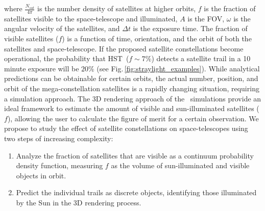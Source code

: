 \documentclass[usenames,dvipsnames,modern]{CLASS_FILES/aastex631}  %
\newcommand{\Hubble}{HST}
\begin{document}
where $\frac{N_{sat}}{4 \pi}$ is the number density of satellites at higher orbits, $f$ is the fraction of satellites visible to the space-telescope and illuminated, $A$ is the FOV, $\omega$ is the angular velocity of the satellites, and $\Delta t$ is the exposure time. The fraction of visible satellites ($f$) is a function of time, orientation, and the orbit of both the satellites and space-telescope. If the proposed satellite constellations become operational, the probability that \Hubble\ ($f\sim7\%$) detects a satellite trail in a 10 minute exposure will be $20\%$ (see Fig.\,\ref{fig:straylight_examples}). While analytical predictions can be obtainable for certain orbits, the actual number, position, and orbit of the mega-constellation satellites is a rapidly changing situation, requiring a simulation approach. The 3D rendering approach of the \MyName\ simulations provide an ideal framework to estimate the amount of visible and sun-illuminated satellites ($f$), allowing the user to calculate the figure of merit for a certain observation. We propose to study the effect of satellite constellations on space-telescopes using two steps of increasing complexity: 

\begin{enumerate}
    \item Analyze the fraction of satellites that are visible as a continuum probability density function, measuring $f$ as the volume of sun-illuminated and visible objects in orbit.
    
    \item Predict the individual trails as discrete objects, identifying those illuminated by the Sun in the 3D rendering process.
\end{enumerate}
\end{document}
